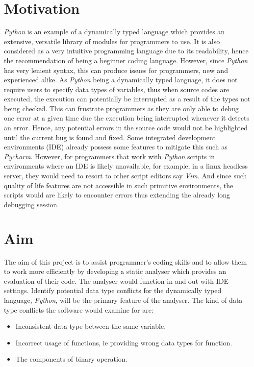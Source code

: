 \documentclass{l4proj}
\begin{document}
\section{Motivation}
\emph{Python} is an example of a dynamically typed language which provides an extensive, versatile library of modules for programmers to use. It is also considered as a very intuitive programming language due to its readability, hence the recommendation of being a beginner coding language. However, since \emph{Python} has very lenient syntax, this can produce issues for programmers, new and experienced alike. As \emph{Python} being a dynamically typed language, it does not require users to specify data types of variables, thus when source codes are executed, the execution can potentially be interrupted as a result of the types not being checked. This can frustrate programmers as they are only able to debug one error at a given time due the execution being interrupted whenever it detects an error. Hence, any potential errors in the source code would not be highlighted until the current bug is found and fixed. Some integrated development environments (IDE) already possess some features to mitigate this such as \emph{Pycharm}. However, for programmers that work with \emph{Python} scripts in environments where an IDE is likely unavailable, for example, in a linux headless server, they would need to resort to other script editors say \emph{Vim}. And since such quality of life features are not accessible in such primitive environments, the scripts would are likely to encounter errors thus extending the already long debugging session. 


\section{Aim}
The aim of this project is to assist programmer's coding skills and to allow them to work more efficiently by developing a static analyser which provides an evaluation of their code. The analyser would function in and out with IDE settings. Identify potential data type conflicts for the dynamically typed language, \emph{Python}, will be the primary feature of the analyser. The kind of data type conflicts the software would examine for are:
\begin{itemize}
    \item Inconsistent data type between the same variable.
    \item Incorrect usage of functions, ie providing wrong data types for function.
    \item The components of binary operation.
\end{itemize}
\end{document}
